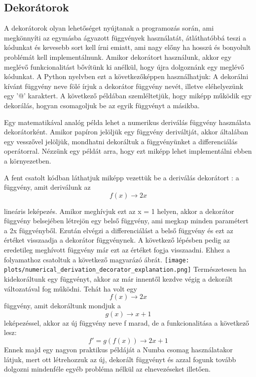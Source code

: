 \documentclass{article}
\theoremstyle{definition}
\theoremstyle{theorem}
\begin{document}
\subsection{Dekorátorok}
A dekorátorok olyan lehetőséget nyújtanak a programozás során, ami megkönnyíti az egymásba ágyazott függvények használatát, átláthatóbbá teszi a kódunkat és kevesebb sort kell írni emiatt, ami nagy előny ha hosszú és bonyolult problémát kell implementálnunk. Amikor dekorátort használunk, akkor egy meglévő funkcionalitást bővítünk ki anélkül, hogy újra dolgoznánk egy meglévő kódunkat. A Python nyelvben ezt a következőképpen használhatjuk: A dekorálni kívánt függvény neve fölé írjuk a dekorátor függvény nevét, illetve eléhelyezünk egy '@' karaktert. A következő példában szemléltetjük, hogy miképp működik egy dekorálás, hogyan csomagoljuk be az egyik függvényt a másikba.

\pagebreak
Egy matematikával analóg példa lehet a numerikus deriválás függvény használata dekorátorként. Amikor papíron jelöljük egy függvény deriváltját, akkor általában egy vesszővel jelöljük, mondhatni dekoráltuk a függvényünket a differenciálás operátorral. Nézzünk egy példát arra, hogy ezt miképp lehet implementálni ebben a környezetben.

A fent csatolt kódban láthatjuk miképp vezettük be a deriválás dekorátort : a függvény, amit deriválunk az
\begin{equation*}
    f(x) \rightarrow 2x
\end{equation*}

lineáris leképezés. Amikor meghívjuk ezt az x = 1 helyen, akkor a dekorátor függvény belsejében létrejön egy belső függvény, ami megkap minden paramétert a 2x függvényből. Ezután elvégzi a differenciálást a belső függvény és ezt az értéket visszaadja a dekorátor függvénynek. A következő lépésben pedig az eredetileg meghívott függvény már ezt az értéket fogja visszaadni. Ehhez a folyamathoz csatoltuk a következő magyarázó ábrát. \newline
\texttt{[image: plots/numerical\_derivation\_decorator\_explanation.png]}
Természetesen ha kidekoráltunk egy függvényt, akkor az már innentől kezdve végig a dekorált változatával fog működni. Tehát ha volt egy
\begin{equation*}
    f(x) \rightarrow 2x
\end{equation*}
függvény, amit dekoráltunk mondjuk a
\begin{equation*}
    g(x) \rightarrow x + 1
\end{equation*}
leképezéssel, akkor az új függvény neve f marad, de a funkcionalitása a következő lesz:
\begin{equation*}
    f' = g(f(x)) \rightarrow 2x + 1
\end{equation*}
Ennek majd egy nagyon praktikus példáját a Numba csomag használatakor látjuk, mert ott létrehozzuk az új, dekorált függvényt és azzal fogunk tovább dolgozni mindenféle egyéb probléma nélkül az elnevezéseket illetően.
\end{document}
